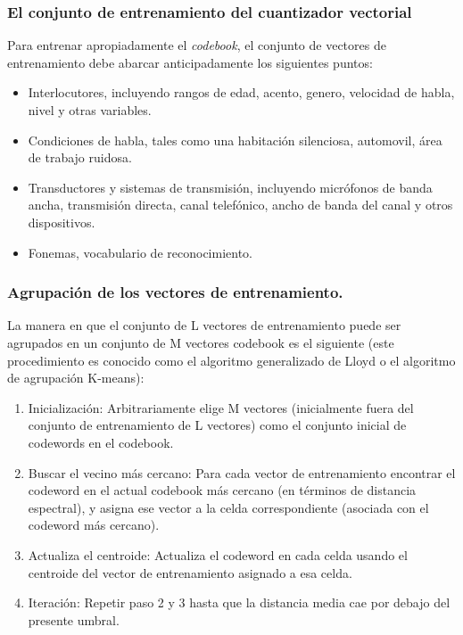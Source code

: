 \subsubsection{El conjunto de entrenamiento del cuantizador vectorial}

Para entrenar apropiadamente el \textit{codebook}, el conjunto de vectores de entrenamiento debe abarcar anticipadamente los siguientes puntos:

\begin{itemize}
\item	Interlocutores, incluyendo rangos de edad, acento, genero, velocidad de habla, nivel y otras variables.
\item	Condiciones de habla, tales como una habitación silenciosa, automovil, área de trabajo ruidosa.
\item	Transductores y sistemas de transmisión, incluyendo micrófonos de banda ancha, transmisión directa, canal telefónico, ancho de banda del canal y otros dispositivos.
\item	Fonemas, vocabulario de reconocimiento.
\end{itemize}

\subsubsection{Agrupación de los vectores de entrenamiento.}

La manera en que el conjunto de L vectores de entrenamiento puede ser agrupados en un conjunto de M vectores codebook es el siguiente (este procedimiento es conocido como el algoritmo generalizado de Lloyd o el algoritmo de agrupación K-means):

\begin{enumerate}
\item	Inicialización: Arbitrariamente elige M vectores (inicialmente fuera del conjunto de entrenamiento de L vectores) como el conjunto inicial de codewords en el codebook.
\item	Buscar el vecino más cercano: Para cada vector de entrenamiento encontrar el codeword en el actual codebook más cercano (en términos de distancia espectral), y asigna ese vector a la celda correspondiente (asociada con el codeword más cercano).
\item	Actualiza el centroide: Actualiza el codeword en cada celda usando el centroide del vector de entrenamiento asignado a esa celda.
\item	Iteración: Repetir paso 2 y 3 hasta que la distancia media cae por debajo del presente umbral.
\end{enumerate}

